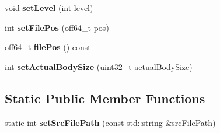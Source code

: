 \begin{DoxyCompactItemize}
\mbox{\label{classmp4_parser_1_1_box_a9d5310a15e0682f0021166c3a2575a48}} 
void {\bfseries set\+Level} (int level)
\item 
\mbox{\label{classmp4_parser_1_1_box_a8fa16565b584301d391c849d237b3010}} 
int {\bfseries set\+File\+Pos} (off64\+\_\+t pos)
\item 
\mbox{\label{classmp4_parser_1_1_box_ad922fd273809026c46ed0159647a64bd}} 
off64\+\_\+t {\bfseries file\+Pos} () const
\item 
\mbox{\label{classmp4_parser_1_1_box_a29a95b1fc05aa5dedef0937c2796c0e2}} 
int {\bfseries set\+Actual\+Body\+Size} (uint32\+\_\+t actual\+Body\+Size)
\end{DoxyCompactItemize}
\subsection*{Static Public Member Functions}
\begin{DoxyCompactItemize}
\item 
\mbox{\label{classmp4_parser_1_1_box_a904c94abd71624fa9844b9a7001f7505}} 
static int {\bfseries set\+Src\+File\+Path} (const std\+::string \&src\+File\+Path)
\end{DoxyCompactItemize}
